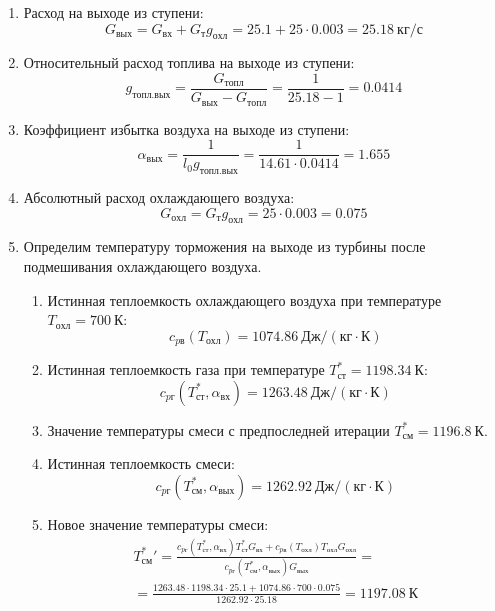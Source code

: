 \documentclass[a4paper,10pt]{article}
\begin{document}
\begin{enumerate}
        \item Расход на выходе из ступени:
        \[
            G_{вых} = G_{вх} + G_т g_{охл} =
                25.1 + 25 \cdot
                0.003 =
            25.18 \ кг/с
        \]

        \item Относительный расход топлива на выходе из ступени:
        \[
            g_{топл.вых} = \frac{ G_{топл} }{ G_{вых} - G_{топл} } =
                 \frac{ 1 }{ 25.18 - 1 } =
            0.0414
        \]

        \item Коэффициент избытка воздуха на выходе из ступени:
        \[
            \alpha_{вых} = \frac{ 1 }{ l_0 g_{топл.вых} } =
                \frac{ 1 }{ 14.61 \cdot 0.0414 } =
            1.655
        \]

        \item Абсолютный расход охлаждающего воздуха:
        \[
            G_{охл} = G_т g_{охл} = 25 \cdot 0.003 =
            0.075
        \]

        \item Определим температуру торможения на выходе из турбины после подмешивания охлаждающего воздуха.
        \begin{enumerate}

            \item Истинная теплоемкость охлаждающего воздуха при температуре $T_{охл} = 700\ К $:
            \[
                c_{pв} (T_{охл}) = 1074.86\ Дж/ (кг \cdot К)
            \]

            \item Истинная теплоемкость газа при температуре $T_{ст}^* = 1198.34 \ К $:
            \[
                c_{pг} (T_{ст}^*, \alpha_{вх}) =
                1263.48\ Дж/ (кг \cdot К)
            \]

            \item Значение температуры смеси с предпоследней итерации $T_{см}^{*} = 1196.8\ К$.

            \item Истинная теплоемкость смеси:
            \[
                c_{pг} (T_{см}^{*}, \alpha_{вых}) =
                1262.92\ Дж/ (кг \cdot К)
            \]

            \item Новое значение температуры смеси:
            \begin{gather*}
                T_{см}^*\prime = \frac{
                        c_{pг} (T_{ст}^*, \alpha_{вх}) T_{ст}^* G_{вх} + c_{pв} (T_{охл}) T_{охл} G_{охл}
                    }{
                        c_{pг} (T_{см}^{*}, \alpha_{вых}) G_{вых}
                    } =\\
                = \frac{
                    1263.48
                    \cdot 1198.34 \cdot 25.1 +
                    1074.86
                    \cdot 700 \cdot 0.075
                }{
                    1262.92
                    \cdot  25.18
                } =
                1197.08\ К\\
            \end{gather*}


\end{enumerate}
\end{enumerate}
\end{document}
